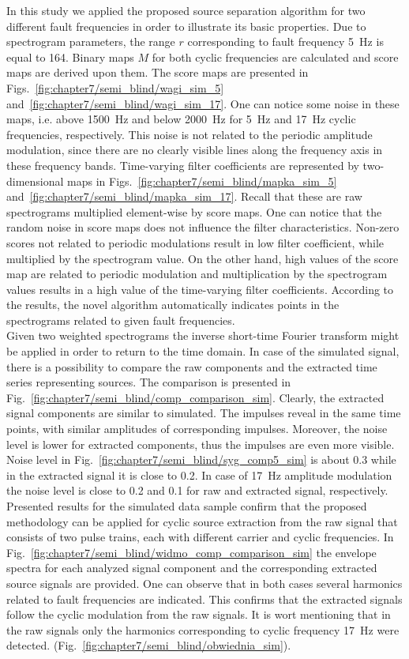 In this study we applied the proposed source separation algorithm for two different fault frequencies in order to illustrate its basic properties. Due to spectrogram parameters, the range $r$ corresponding to fault frequency 5~Hz is equal to 164. Binary maps $M$ for both cyclic frequencies are calculated and score maps are derived upon them. The score maps are presented in Figs.~\ref{fig:chapter7/semi_blind/wagi_sim_5} and~\ref{fig:chapter7/semi_blind/wagi_sim_17}. One can notice some noise in these maps, i.e. above 1500~Hz and below 2000~Hz for 5~Hz and 17~Hz cyclic frequencies, respectively. This noise is not related to the periodic amplitude modulation, since there are no clearly visible lines along the frequency axis in these frequency bands. Time-varying filter coefficients are represented by two-dimensional maps in Figs.~\ref{fig:chapter7/semi_blind/mapka_sim_5} and~\ref{fig:chapter7/semi_blind/mapka_sim_17}. Recall that these are raw spectrograms multiplied element-wise by score maps. One can notice that the random noise in score maps does not influence the filter characteristics. Non-zero scores not related to periodic modulations result in low filter coefficient, while multiplied by the spectrogram value. On the other hand, high values of the score map are related to periodic modulation and multiplication by the spectrogram values results in a high value of the time-varying filter coefficients. According to the results, the novel algorithm automatically indicates points in the spectrograms related to given fault frequencies.\\
Given two weighted spectrograms the inverse short-time Fourier transform might be applied in order to return to the time domain. In case of the simulated signal, there is a possibility to compare the raw components and the extracted time series representing sources. The comparison is presented in Fig.~\ref{fig:chapter7/semi_blind/comp_comparison_sim}. Clearly, the extracted signal components are similar to simulated. The impulses reveal in the same time points, with similar amplitudes of corresponding impulses. Moreover, the noise level is lower for extracted components, thus the impulses are even more visible. Noise level in Fig.~\ref{fig:chapter7/semi_blind/syg_comp5_sim} is about 0.3 while in the extracted signal it is close to 0.2. In case of 17~Hz amplitude modulation the noise level is close to 0.2 and 0.1 for raw and extracted signal, respectively. Presented results for the simulated data sample confirm that the proposed methodology can be applied for cyclic source extraction from the raw signal that consists of two pulse trains, each with different carrier and cyclic frequencies. In Fig.~\ref{fig:chapter7/semi_blind/widmo_comp_comparison_sim} the envelope spectra for each analyzed signal component and the corresponding extracted source signals are provided. One can observe that in both cases several harmonics related to fault frequencies are indicated. This confirms that the extracted signals follow the cyclic modulation from the raw signals. It is wort mentioning that in the raw signals only the harmonics corresponding to cyclic frequency 17~Hz were detected. (Fig.~\ref{fig:chapter7/semi_blind/obwiednia_sim}).
